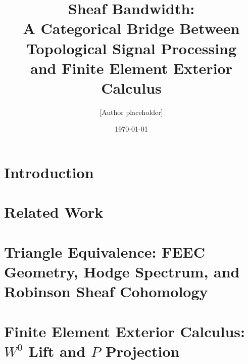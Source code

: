 \documentclass[11pt,reqno]{amsart}
\title[Sheaf Bandwidth: A Categorical Bridge]{Sheaf Bandwidth:\\
  A Categorical Bridge Between Topological Signal Processing\\
  and Finite Element Exterior Calculus}
\author{[Author placeholder]}
\date{\today}
\theoremstyle{plain}
\theoremstyle{definition}
\theoremstyle{definition}
\theoremstyle{definition}
\begin{document}
\maketitle

\nocite{*}

\begin{abstract}

\end{abstract}

\section{Introduction}\label{sec:intro}


\section{Related Work}\label{sec:related}


\section{Triangle Equivalence: FEEC Geometry, Hodge Spectrum, and Robinson Sheaf Cohomology}\label{sec:triangle}


\section{Finite Element Exterior Calculus: $W^0$ Lift and $P$ Projection}\label{sec:feec_review}


\end{document}
